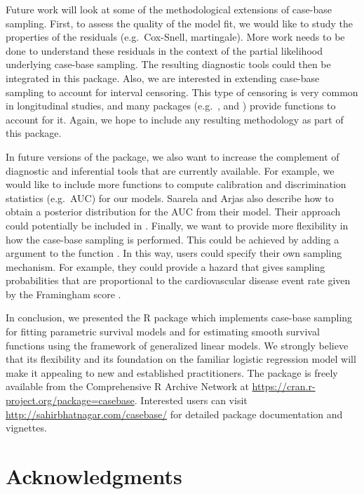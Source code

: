 Future work will look at some of the methodological extensions of
case-base sampling. First, to assess the quality of the model fit, we
would like to study the properties of the residuals (e.g.~Cox-Snell,
martingale). More work needs to be done to understand these residuals in
the context of the partial likelihood underlying case-base sampling. The
resulting diagnostic tools could then be integrated in this package.
Also, we are interested in extending case-base sampling to account for
interval censoring. This type of censoring is very common in
longitudinal studies, and many packages (e.g.~,
 and ) provide functions to account for it.
Again, we hope to include any resulting methodology as part of this
package.

In future versions of the package, we also want to increase the
complement of diagnostic and inferential tools that are currently
available. For example, we would like to include more functions to
compute calibration and discrimination statistics (e.g.~AUC) for our
models. Saarela and Arjas \citeyearpar{saarela2015non} also describe how
to obtain a posterior distribution for the AUC from their model. Their
approach could potentially be included in . Finally, we
want to provide more flexibility in how the case-base sampling is
performed. This could be achieved by adding a  argument to
the function . In this way, users could specify
their own sampling mechanism. For example, they could provide a hazard
that gives sampling probabilities that are proportional to the
cardiovascular disease event rate given by the Framingham score
\citep{saarela2015non}.

In conclusion, we presented the R package  which
implements case-base sampling for fitting parametric survival models and
for estimating smooth survival functions using the framework of
generalized linear models. We strongly believe that its flexibility and
its foundation on the familiar logistic regression model will make it
appealing to new and established practitioners. The 
package is freely available from the Comprehensive R Archive Network at
\url{https://cran.r-project.org/package=casebase}. Interested users can
visit \url{http://sahirbhatnagar.com/casebase/} for detailed package
documentation and vignettes.

\hypertarget{acknowledgments}{%
\section{Acknowledgments}\label{acknowledgments}}

